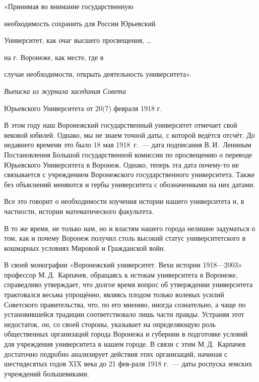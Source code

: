 
\vzmscaption

\begin{flushright}
«Принимая во внимание государственную

необходимость сохранить для России Юрьевский

Университет, как очаг высшего просвещения, \ldots

 на г. Воронеже, как месте, где в

случае необходимости, открыть деятельность университета».

{\it Выписка из журнала заседания Совета

Юрьевского Университета от 20(7) февраля 1918 г.}
\end{flushright}
В этом году наш Воронежский государственный университет отмечает свой вековой юбилей.
Однако, мы не знаем точной даты, с которой ведётся отсчёт.
До недавнего времени это было 18 мая 1918~г.~---
дата подписания В.\,И.~Лениным Постановления Большой государственной комиссии по просвещению
о переводе Юрьевского Университета в Воронеж.
Однако, теперь эта дата почему-то не связывается с учреждением Воронежского государственного университета.
Также без объяснений меняются и гербы университета с обозначенными на них датами.

Все это говорит о необходимости изучения истории нашего университета и, в частности, истории математического факультета.

В	то же время, не только нам, но и властям нашего города нелишне задуматься о том, как и почему Воронеж получил столь высокий статус университетского в кошмарных условиях Мировой и Гражданской войн.

В	своей монографии «Воронежский университет. Вехи истории 1918—2003» профессор М.\,Д.~Карпачев, обращаясь к истокам университета в Воронеже, справедливо утверждает, что долгое время вопрос об утверждении университета трактовался весьма упрощённо, являясь плодом только волевых усилий Советского правительства, что, по его мнению, иногда сознательно, а чаще по установившейся традиции соответствовало лишь части правды. Устраняя этот недостаток, он, со своей стороны, указывает на определяющую роль общественных организаций города Воронежа и губернии в подготовке условий для учреждения университета в нашем городе. В связи с	этим М.\,Д.~Карпачев достаточно подробно анализирует действия этих организаций, начиная с шестидесятых годов XIX века до 21 фев-раля 1918 г.~--- даты роспуска земских учреждений большевиками.

